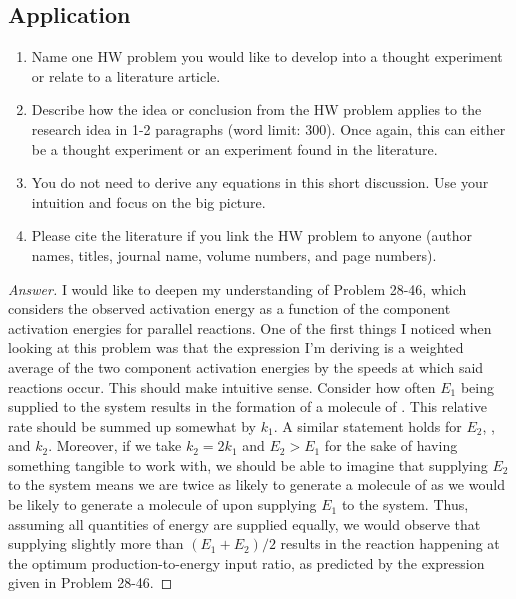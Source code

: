 \documentclass[../psets.tex]{subfiles}
\begin{document}
\subsection*{Application}
\begin{enumerate}[label={\arabic*)}]
    \item Name one HW problem you would like to develop into a thought experiment or relate to a literature article.
    \item Describe how the idea or conclusion from the HW problem applies to the research idea in 1-2 paragraphs (word limit: 300). Once again, this can either be a thought experiment or an experiment found in the literature.
    \item You do not need to derive any equations in this short discussion. Use your intuition and focus on the big picture.
    \item Please cite the literature if you link the HW problem to anyone (author names, titles, journal name, volume numbers, and page numbers).
\end{enumerate}
\begin{proof}[Answer]
    I would like to deepen my understanding of Problem 28-46, which considers the observed activation energy as a function of the component activation energies for parallel reactions. One of the first things I noticed when looking at this problem was that the expression I'm deriving is a weighted average of the two component activation energies by the speeds at which said reactions occur. This should make intuitive sense. Consider how often $E_1$ being supplied to the system results in the formation of a molecule of . This relative rate should be summed up somewhat by $k_1$. A similar statement holds for $E_2$, , and $k_2$. Moreover, if we take $k_2=2k_1$ and $E_2>E_1$ for the sake of having something tangible to work with, we should be able to imagine that supplying $E_2$ to the system means we are twice as likely to generate a molecule of  as we would be likely to generate a molecule of  upon supplying $E_1$ to the system. Thus, assuming all quantities of energy are supplied equally, we would observe that supplying slightly more than $(E_1+E_2)/2$ results in the reaction happening at the optimum production-to-energy input ratio, as predicted by the expression given in Problem 28-46.
\end{proof}
\setcounter{equation}{0}
\end{document}
